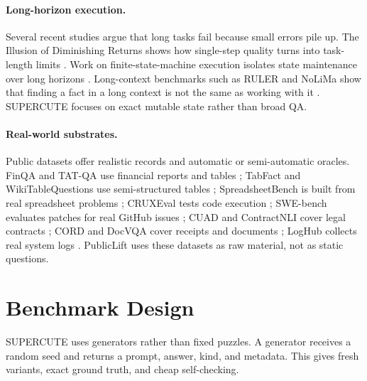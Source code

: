 \documentclass[10pt,twocolumn]{article}
\begin{document}
\paragraph{Long-horizon execution.}
Several recent studies argue that long tasks fail because small errors pile up. The Illusion of Diminishing Returns shows how single-step quality turns into task-length limits \citep{herel2025illusion}. Work on finite-state-machine execution isolates state maintenance over long horizons \citep{fsm2025procedural}. Long-context benchmarks such as RULER and NoLiMa show that finding a fact in a long context is not the same as working with it \citep{hsieh2024ruler,keren2025nolima}. SUPERCUTE focuses on exact mutable state rather than broad QA.

\paragraph{Real-world substrates.}
Public datasets offer realistic records and automatic or semi-automatic oracles. FinQA and TAT-QA use financial reports and tables \citep{chen2021finqa,zhu2022tatqa}; TabFact and WikiTableQuestions use semi-structured tables \citep{chen2020tabfact,pasupat2015wikitq}; SpreadsheetBench is built from real spreadsheet problems \citep{ma2024spreadsheetbench}; CRUXEval tests code execution \citep{gu2024cruxeval}; SWE-bench evaluates patches for real GitHub issues \citep{jimenez2024swebench}; CUAD and ContractNLI cover legal contracts \citep{hendrycks2021cuad,koreeda2021contractnli}; CORD and DocVQA cover receipts and documents \citep{park2019cord,mathew2021docvqa}; LogHub collects real system logs \citep{zhu2023loghub}. PublicLift uses these datasets as raw material, not as static questions.

\section{Benchmark Design}
SUPERCUTE uses generators rather than fixed puzzles. A generator receives a random seed and returns a prompt, answer, kind, and metadata. This gives fresh variants, exact ground truth, and cheap self-checking.
\end{document}
